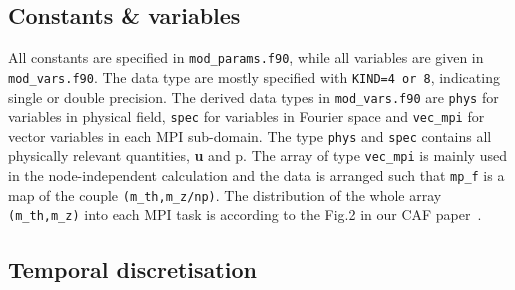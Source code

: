 \documentclass[a4paper, 11pt, DIV=11]{scrartcl}
\begin{document}
\subsection{Constants \& variables}
All constants are specified in \verb+mod_params.f90+, while all variables are given 
in \verb+mod_vars.f90+. The data type are mostly specified with \verb+KIND=4 or 8+, 
indicating single or double precision. The derived data types in \verb+mod_vars.f90+ 
are \verb+phys+ for variables in physical field, \verb+spec+ for variables in Fourier
 space and \verb+vec_mpi+ for vector variables in each MPI sub-domain. The type 
\verb+phys+ and \verb+spec+ contains all physically relevant quantities, \textbf{u} and p. 
The array of type \verb+vec_mpi+ is mainly used in the node-independent calculation and 
the data is arranged such that \verb+mp_f+ is a map of the couple 
\verb+(m_th,m_z/np)+. The distribution of the whole array \verb+(m_th,m_z)+ into each MPI task 
is according to the Fig.2 in our CAF paper~\cite{Shi2015}. 

\subsection{Temporal discretisation}
\label{sec:timeStepper}
\end{document}
